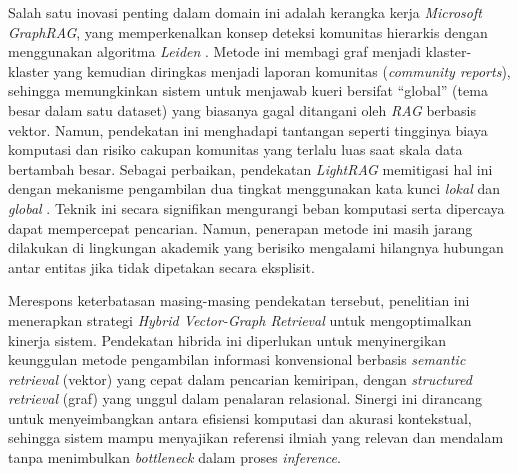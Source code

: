 Salah satu inovasi penting dalam domain ini adalah kerangka kerja \textit{Microsoft GraphRAG}, yang memperkenalkan konsep deteksi komunitas hierarkis dengan menggunakan algoritma \textit{Leiden} \citep{edge2025localglobalgraphrag}. Metode ini membagi graf menjadi klaster-klaster yang kemudian diringkas menjadi laporan komunitas (\textit{community reports}), sehingga memungkinkan sistem untuk menjawab kueri bersifat ``global'' (tema besar dalam satu dataset) yang biasanya gagal ditangani oleh \textit{RAG} berbasis vektor. Namun, pendekatan ini menghadapi tantangan seperti tingginya biaya komputasi dan risiko cakupan komunitas yang terlalu luas saat skala data bertambah besar. Sebagai perbaikan, pendekatan \textit{LightRAG} memitigasi hal ini dengan mekanisme pengambilan dua tingkat menggunakan kata kunci \textit{lokal} dan \textit{global} \citep{guo2025lightragsimplefastretrievalaugmented}. Teknik ini secara signifikan mengurangi beban komputasi serta dipercaya dapat mempercepat pencarian. Namun, penerapan metode ini masih jarang dilakukan di lingkungan akademik yang berisiko mengalami hilangnya hubungan antar entitas jika tidak dipetakan secara eksplisit.

Merespons keterbatasan masing-masing pendekatan tersebut, penelitian ini menerapkan strategi \textit{Hybrid Vector-Graph Retrieval} untuk mengoptimalkan kinerja sistem. Pendekatan hibrida ini diperlukan untuk menyinergikan keunggulan metode pengambilan informasi konvensional berbasis \textit{semantic retrieval} (vektor) yang cepat dalam pencarian kemiripan, dengan \textit{structured retrieval} (graf) yang unggul dalam penalaran relasional. Sinergi ini dirancang untuk menyeimbangkan antara efisiensi komputasi dan akurasi kontekstual, sehingga sistem mampu menyajikan referensi ilmiah yang relevan dan mendalam tanpa menimbulkan \textit{bottleneck} dalam proses \textit{inference}.
